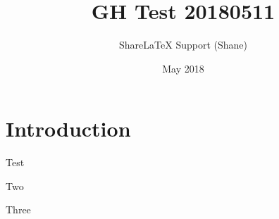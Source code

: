 \documentclass{article}
\title{GH Test 20180511}
\author{ShareLaTeX Support (Shane)}
\date{May 2018}
\begin{document}
\maketitle

\section{Introduction}

Test

Two


Three
\end{document}

